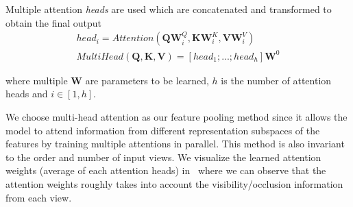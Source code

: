 Multiple attention \emph{heads} are used which are concatenated and transformed to obtain the final output
\begin{align}
    head_i = Attention(\mathbf{Q} \mathbf{W}^{Q}_{i}, \mathbf{K} \mathbf{W}^{K}_{i}, \mathbf{V} \mathbf{W}^{V}_{i}) \label{equ:attention_head} \\
    MultiHead(\mathbf{Q}, \mathbf{K}, \mathbf{V}) = [head_1; ...; head_h] \mathbf{W}^0 \label{equ:multihead_attention}
\end{align}

\noindent where multiple $\mathbf{W}$ are parameters to be learned,
$h$ is the number of attention heads and $i\in[1,h]$.


We choose multi-head attention as our feature pooling method since it allows the model to attend information from different representation subspaces of the features by training multiple attentions in parallel.
This method is also invariant to the order and number of input views.
We visualize the learned attention weights (average of each attention heads) in~ where we can observe that the attention weights roughly takes into account the visibility/occlusion information from each view.



%

